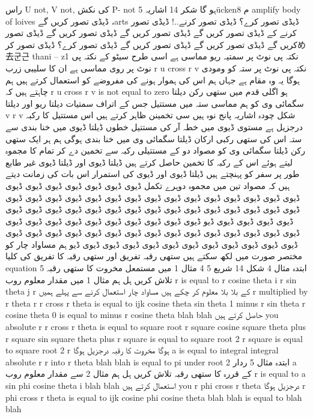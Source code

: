 راس U not, V not, کی نکش P- not ہو گا
شکر 14 اشاریہ 5ückenم 8 amplify body of loives
ڈیڈی تصور کریں گے ،arts
ڈیڈی تصور کرے؟
ڈیڈی تصور کرنے..!
ڈیڈی تصور کرنے کے ڈیڈی تصور کریں گے ڈیڈی تصور کریں گے ڈیڈی تصور کریں گے ڈیڈی تصور کریں گے ڈیڈی تصور کریں گے ڈیڈی تصور کریں گے ڈیڈی تصور کرے؟ ڈیڈی تصور کرめ去군근 thani – z1
نکتہ پی نوٹ پر سمتیہ ریو مماسی ہے
اسی طرح سیٹو کے نکتہ پی نوٹ پر روی مماسی ہے
ان کا سلیبی زرب r u cross r v نکتہ پی نوٹ پر ستہ کو ومودی ہوگا
یہ وہ مقام ہے جہاں ہم اس کی ہموار ہونے کی مفروضے کو استعمال کرتے ہیں
ہم چاہتے ہیں کہ r u cross r v is not equal to zero ہو
اگلی قدم میں ستھی رکن دیلتا سگمائی وی کو ہم مماسی ستہ میں مستتیل جس کے اتراف سمتیات دیلتا ریو اور دیلتا v r v شکل چودہ اشاریہ پانج نوہ ہیں
سی تخمینن ظاہر کرتے ہیں اس مستتیل کا رکبہ درجزیل ہے
مستوی ڈیوی میں خطہ آر کی مستتیل خطوں ڈیلتا ڈیوی میں خنا بندی سے ستہ اس کی
ستھی رکبی ارکان ڈیلتا سگمائی وی میں خنا بندی ہوگی
ہم ہر ایک ستھی رکن ڈیلتا سگمائی وی کو مصواد دو کے مستتیلی رکبہ سے تخمین دے کر تمام کا مجموہ لیتے ہوئے
اس کے رکبہ کا تخمین حاصل کرتے ہیں ڈیلتا ڈیوی اور ڈیلتا ڈیوی غیر طابع طور پر سفر کو پہنچتے ہیں
ڈیلتا ڈیوی اور ڈیوی کی استمرار اس بات کی زمانت دیتے ہیں کہ مصواد تین میں مجموہ دوہرے تکمل ڈیوی ڈیوی ڈیوی ڈیوی ڈیوی
ڈیوی ڈیوی ڈیوی ڈیوی ڈیوی ڈیوی ڈیوی ڈیوی ڈیوی ڈیوی ڈیوی ڈیوی ڈیوی ڈیوی ڈیوی ڈیوی ڈیوی ڈیوی ڈیوی ڈیوی ڈیوی ڈیوی ڈیوی ڈیوی ڈیوی ڈیوی ڈیوی ڈیوی ڈیوی ڈیوی ڈیوی ڈیوی ڈیوی ڈیوی ڈیوی ڈیوی ڈیو
ڈیوی ڈیوی ڈیوی ڈیوی ڈیوی ڈیوی ڈیوی ڈیوی ڈیوی ڈیوی ڈیوی ڈیوی ڈیوی ڈیوی ڈیوی ڈیوی ڈیوی ڈیوی ڈیوی ڈیوی ڈیوی ڈیوی ڈیوی ڈیوی ڈیوی ڈیوی ڈیوی ڈیوی ڈیوی ڈیوی ڈیوی ڈیوی ڈیوی ڈیوی ڈیوی ڈیوی ڈیو
ہم مساواد چار کو مختصر صورت میں لکھ سکتے ہیں
ستھی رقبہ تفریق اور ستھی رقبہ کا تفریق کی کلیا
equation 5
ابتدہ مثال 4
شکل 14 شریع 5 4
مثال 1 میں مستمعل مخروت کا ستھی رقبہ تلاش کریں
ہل
ہم مثال 1 میں مقدار معلوم روب
r is equal to r cosine theta i r sin theta j r کے بلا بلا معلوم کر چکے ہیں
مساواد چار استعمال کرنے سے پہلے ہمیں r multiplied by r theta
r r cross r theta is equal to ijk cosine theta sin theta 1 minus r sin theta r cosine theta 0 is equal to minus r cosine theta blah blah
حاصل کرتے ہیں
you absolute r r cross r theta is equal to square root r square cosine square theta plus r square sin square theta plus r square is equal to square root 2 r square is equal to square root 2 r ہوگا
مخروت کا رقبہ درجزیل ہوگا
a is equal to integral integral absolute r r into r theta blah blah is equal to pi under root 2
ابتدہ مثال 5
ردار a کے قررہ کا ستھی رقبہ تلاش کریں
ہل
ہم مثال 2 سے مقدار معلوم روب r is equal to a sin phi cosine theta i blah blah استعمال کرتے ہیں
you r phi cross r theta درجزیل ہوگا
r phi cross r theta is equal to ijk cosine phi cosine theta blah blah is equal to blah blah

